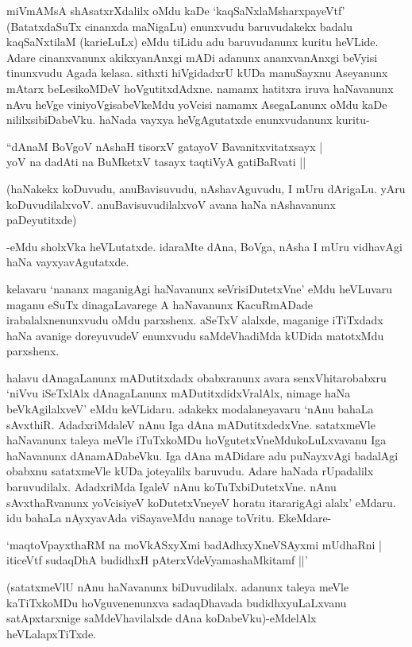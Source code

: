 miVmAMsA shAsatxrXdalilx oMdu kaDe `kaqSaNxlaMsharxpayeVtf' (BatatxdaSuTx cinanxda maNigaLu) enunxvudu baruvudakekx badalu kaqSaNxtilaM (karieLuLx) eMdu tiLidu adu baruvudanunx kuritu heVLide. Adare cinanxvanunx akikxyanAnxgi mADi adanunx ananxvanAnxgi beVyisi tinunxvudu Agada kelasa. sithxti hiVgidadxrU kUDa manuSayxnu Aseyanunx mAtarx beLesikoMDeV hoVgutitxdAdxne. namamx hatitxra iruva haNavanunx nAvu heVge viniyoVgisabeVkeMdu yoVcisi namamx AsegaLanunx oMdu kaDe nililxsibiDabeVku. haNada vayxya heVgAgutatxde enunxvudanunx kuritu-

\begin{shloka}
``dAnaM BoVgoV nAshaH tisorxV gatayoV Bavanitxvitatxsayx |\\
yoV na dadAti na BuMketxV tasayx taqtiVyA gatiBaRvati ||
\end{shloka}

(haNakekx koDuvudu, anuBavisuvudu, nAshavAguvudu, I mUru dArigaLu. yAru koDuvudilalxvoV. anuBavisuvudilalxvoV avana haNa nAshavanunx paDeyutitxde)

-eMdu sholxVka heVLutatxde. idaraMte dAna, BoVga, nAsha I mUru vidhavAgi haNa vayxyavAgutatxde.

kelavaru `nananx maganigAgi haNavanunx seVrisiDutetxVne' eMdu heVLuvaru maganu eSuTx dinagaLavarege A haNavanunx KacuRmADade irabalalxnenunxvudu oMdu parxshenx. aSeTxV alalxde, maganige iTiTxdadx haNa avanige doreyuvudeV enunxvudu saMdeVhadiMda kUDida matotxMdu parxshenx.

halavu dAnagaLanunx mADutitxdadx obabxranunx avara senxVhitarobabxru `niVvu iSeTxlAlx dAnagaLanunx mADutitxdidxVralAlx, nimage haNa beVkAgilalxveV' eMdu keVLidaru. adakekx modalaneyavaru `nAnu bahaLa sAvxthiR. AdadxriMdaleV nAnu Iga dAna mADutitxdedxVne. satatxmeVle haNavanunx taleya meVle iTuTxkoMDu hoVgutetxVneMdukoLuLxvavanu Iga haNavanunx dAnamADabeVku. Iga dAna mADidare adu puNayxvAgi badalAgi obabxnu satatxmeVle kUDa joteyalilx baruvudu. Adare haNada rUpadalilx baruvudilalx. AdadxriMda IgaleV nAnu koTuTxbiDutetxVne. nAnu sAvxthaRvanunx yoVcisiyeV koDutetxVneyeV horatu itararigAgi alalx' eMdaru. idu bahaLa nAyxyavAda viSayaveMdu nanage toVritu. EkeMdare-

\begin{shloka}
`maqtoVpayxthaRM na moVkASxyXmi badAdhxyXneVSAyxmi mUdhaRni |\\
iticeVtf sudaqDhA budidhxH pAterxVdeVyamashaMkitamf ||'
\end{shloka}

(satatxmeVlU nAnu haNavanunx biDuvudilalx. adanunx taleya meVle kaTiTxkoMDu hoVguvenenunxva sadaqDhavada budidhxyuLaLxvanu satApxtarxnige saMdeVhavilalxde dAna koDabeVku)-eMdelAlx heVLalapxTiTxde.

